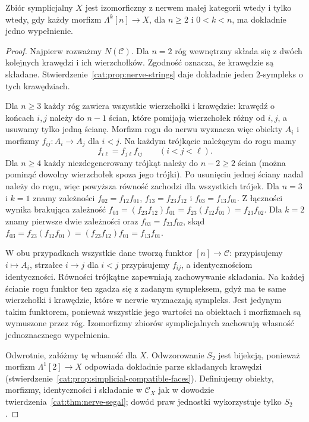 \begin{twierdzenie}\label{cat:thm:nerve-inner-horns}
Zbiór symplicjalny $X$ jest izomorficzny z nerwem małej kategorii wtedy i tylko wtedy, gdy każdy morfizm $\Lambda^k[n]\to X$, dla $n\geq2$ i $0<k<n$, ma dokładnie jedno wypełnienie.
\end{twierdzenie}
\begin{proof}
Najpierw rozważmy $N(\mathcal C)$. Dla $n=2$ róg wewnętrzny składa się z dwóch kolejnych krawędzi i ich wierzchołków. Zgodność oznacza, że krawędzie są składane. Stwierdzenie~\ref{cat:prop:nerve-strings} daje dokładnie jeden $2$-sympleks o tych krawędziach.

Dla $n\geq3$ każdy róg zawiera wszystkie wierzchołki i krawędzie: krawędź o końcach $i,j$ należy do $n-1$ ścian, które pomijają wierzchołek różny od $i,j$, a usuwamy tylko jedną ścianę. Morfizm rogu do nerwu wyznacza więc obiekty $A_i$ i morfizmy $f_{ij}:A_i\to A_j$ dla $i<j$. Na każdym trójkącie należącym do rogu mamy
\[
 f_{i\ell}=f_{j\ell}f_{ij}\qquad(i<j<\ell).
\]
Dla $n\geq4$ każdy niezdegenerowany trójkąt należy do $n-2\geq2$ ścian (można pominąć dowolny wierzchołek spoza jego trójki). Po usunięciu jednej ściany nadal należy do rogu, więc powyższa równość zachodzi dla wszystkich trójek. Dla $n=3$ i $k=1$ znamy zależności $f_{02}=f_{12}f_{01}$, $f_{13}=f_{23}f_{12}$ i $f_{03}=f_{13}f_{01}$. Z łączności wynika brakująca zależność $f_{03}=(f_{23}f_{12})f_{01}=f_{23}(f_{12}f_{01})=f_{23}f_{02}$. Dla $k=2$ znamy pierwsze dwie zależności oraz $f_{03}=f_{23}f_{02}$, skąd $f_{03}=f_{23}(f_{12}f_{01})=(f_{23}f_{12})f_{01}=f_{13}f_{01}$.

W obu przypadkach wszystkie dane tworzą funktor $[n]\to\mathcal C$: przypisujemy $i\mapsto A_i$, strzałce $i\to j$ dla $i<j$ przypisujemy $f_{ij}$, a identycznościom identyczności. Równości trójkątne zapewniają zachowywanie składania. Na każdej ścianie rogu funktor ten zgadza się z zadanym sympleksem, gdyż ma te same wierzchołki i krawędzie, które w nerwie wyznaczają sympleks. Jest jedynym takim funktorem, ponieważ wszystkie jego wartości na obiektach i morfizmach są wymuszone przez róg. Izomorfizmy zbiorów symplicjalnych zachowują własność jednoznacznego wypełnienia.

Odwrotnie, załóżmy tę własność dla $X$. Odwzorowanie $S_2$ jest bijekcją, ponieważ morfizm $\Lambda^1[2]\to X$ odpowiada dokładnie parze składanych krawędzi (stwierdzenie~\ref{cat:prop:simplicial-compatible-faces}). Definiujemy obiekty, morfizmy, identyczności i składanie w $\mathcal C_X$ jak w dowodzie twierdzenia~\ref{cat:thm:nerve-segal}; dowód praw jednostki wykorzystuje tylko $S_2$.


\end{proof}
